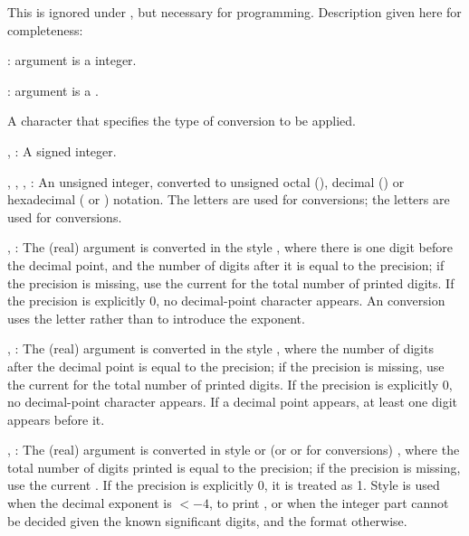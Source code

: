{ This is ignored under , but
necessary for  programming. Description given here for
completeness:

\item {}: argument is a  integer.

\item {}: argument is a .

 A character that specifies the type of
conversion to be applied.

\item {}, : A signed integer.

\item {}, , , : An unsigned integer, converted
to unsigned octal (), decimal () or hexadecimal ( or
) notation. The letters  are used for 
conversions;  the letters  are used for  conversions.

\item {}, : The (real) argument is converted in the style
, where there is one digit before the decimal point,
and the number of digits after it is equal to the precision; if the
precision is missing, use the current  for the total
number of printed digits. If the precision is explicitly 0, no decimal-point
character appears. An  conversion uses the letter  rather
than  to introduce the exponent.

\item {}, : The (real) argument is converted in the style
, where the number of digits after the decimal point
is equal to the precision; if the precision is missing, use the current
 for the total number of printed digits. If the precision
is explicitly 0, no decimal-point character appears. If a decimal point
appears, at least one digit appears before it.

\item {}, : The (real) argument is converted in style
 or  (or  or  for  conversions)
, where the total number of digits printed
is equal to the precision; if the precision is missing, use the current
. If the precision is explicitly 0, it is treated as 1.
Style  is used when
the decimal exponent is $< -4$, to print , or when the integer
part cannot be decided given the known significant digits, and the 
format otherwise.

}
